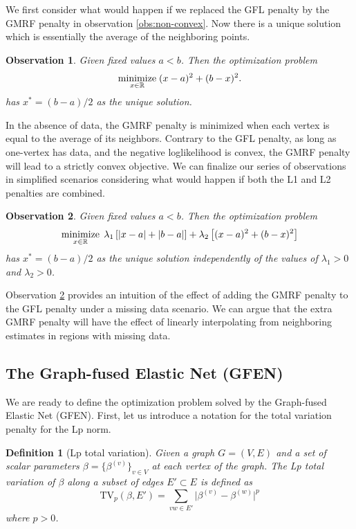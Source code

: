 \documentclass[a4paper, 11pt]{article}
\newtheorem{obs}{Observation}
\newtheorem{mydef}{Definition}
\begin{document}
We first consider what would happen if we replaced the GFL penalty by the GMRF penalty in observation \ref{obs:non-convex}. Now there is a unique solution which is essentially the average of the neighboring points.

 \begin{obs}
 Given fixed values $a < b$. Then the optimization problem
$$
\operatornamewithlimits{minimize}_{x\in\mathbb{R}} \; (x - a)^2 + (b - x)^2.
$$
has $x^*=(b - a) / 2$ as the unique solution.
\end{obs}
In the absence of data, the GMRF penalty is minimized when each vertex is equal to the average of its neighbors. Contrary to the GFL penalty, as long as one-vertex has data, and the negative loglikelihood is convex, the GMRF penalty will lead to a strictly convex objective. We can finalize our series of observations in simplified scenarios considering what would happen if both the L1 and L2 penalties are combined.
\begin{obs}\label{obs:combined}
 Given fixed values $a < b$. Then the optimization problem 
$$
\operatornamewithlimits{minimize}_{x\in\mathbb{R}} \; \lambda_1 \left[|x - a| + |b - a|\right] + \lambda_2 \left[(x - a)^2 + (b - x)^2\right]
$$
has $x^*=(b - a) / 2$ as the unique solution independently of the values of $\lambda_1 > 0$ and $\lambda_2 > 0$.
\end{obs}
Observation \ref{obs:combined} provides an intuition of the effect of adding the GMRF penalty to the GFL penalty under a missing data scenario. We can argue that the extra GMRF penalty will have the effect of linearly interpolating from neighboring estimates in regions with missing data. 


\subsection{The Graph-fused Elastic Net (GFEN)}

We are ready to define the optimization problem solved by the Graph-fused Elastic Net (GFEN). First, let us introduce a notation for the total variation penalty for the Lp norm.

\begin{mydef}[Lp total variation]
Given a graph $G=(V, E)$ and a set of scalar parameters $\beta=\{\beta^{(v)}\}_{v \in V}$ at each vertex of the graph. The Lp total variation of $\beta$ along a subset of edges $E' \subset E$ is defined as 
\begin{equation}
    \mathrm{TV}_p(\beta, E') = \sum_{vw \in E'} \lvert \beta^{(v)} - \beta^{(w)} \rvert ^ p
\end{equation}
where $p > 0$. 
\end{mydef}
\end{document}
